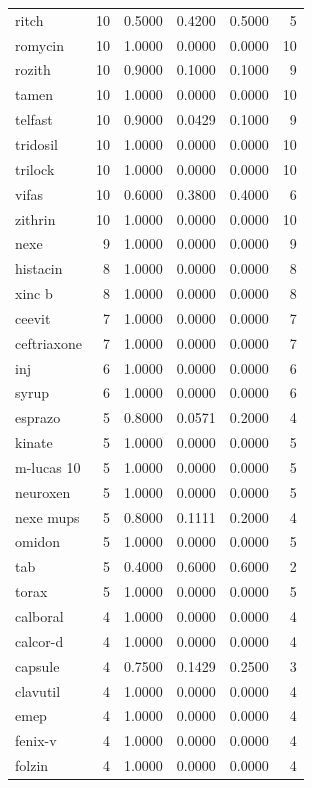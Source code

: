 \begin{longtable}{p{3.0cm}rrrrr}
ritch & 10 & 0.5000 & 0.4200 & 0.5000 & 5 \\
romycin & 10 & 1.0000 & 0.0000 & 0.0000 & 10 \\
rozith & 10 & 0.9000 & 0.1000 & 0.1000 & 9 \\
tamen & 10 & 1.0000 & 0.0000 & 0.0000 & 10 \\
telfast & 10 & 0.9000 & 0.0429 & 0.1000 & 9 \\
tridosil & 10 & 1.0000 & 0.0000 & 0.0000 & 10 \\
trilock & 10 & 1.0000 & 0.0000 & 0.0000 & 10 \\
vifas & 10 & 0.6000 & 0.3800 & 0.4000 & 6 \\
zithrin & 10 & 1.0000 & 0.0000 & 0.0000 & 10 \\
nexe & 9 & 1.0000 & 0.0000 & 0.0000 & 9 \\
histacin & 8 & 1.0000 & 0.0000 & 0.0000 & 8 \\
xinc b & 8 & 1.0000 & 0.0000 & 0.0000 & 8 \\
ceevit & 7 & 1.0000 & 0.0000 & 0.0000 & 7 \\
ceftriaxone & 7 & 1.0000 & 0.0000 & 0.0000 & 7 \\
inj & 6 & 1.0000 & 0.0000 & 0.0000 & 6 \\
syrup & 6 & 1.0000 & 0.0000 & 0.0000 & 6 \\
esprazo & 5 & 0.8000 & 0.0571 & 0.2000 & 4 \\
kinate & 5 & 1.0000 & 0.0000 & 0.0000 & 5 \\
m-lucas 10 & 5 & 1.0000 & 0.0000 & 0.0000 & 5 \\
neuroxen & 5 & 1.0000 & 0.0000 & 0.0000 & 5 \\
nexe mups & 5 & 0.8000 & 0.1111 & 0.2000 & 4 \\
omidon & 5 & 1.0000 & 0.0000 & 0.0000 & 5 \\
tab & 5 & 0.4000 & 0.6000 & 0.6000 & 2 \\
torax & 5 & 1.0000 & 0.0000 & 0.0000 & 5 \\
calboral & 4 & 1.0000 & 0.0000 & 0.0000 & 4 \\
calcor-d & 4 & 1.0000 & 0.0000 & 0.0000 & 4 \\
capsule & 4 & 0.7500 & 0.1429 & 0.2500 & 3 \\
clavutil & 4 & 1.0000 & 0.0000 & 0.0000 & 4 \\
emep & 4 & 1.0000 & 0.0000 & 0.0000 & 4 \\
fenix-v & 4 & 1.0000 & 0.0000 & 0.0000 & 4 \\
folzin & 4 & 1.0000 & 0.0000 & 0.0000 & 4 \\

\end{longtable}
